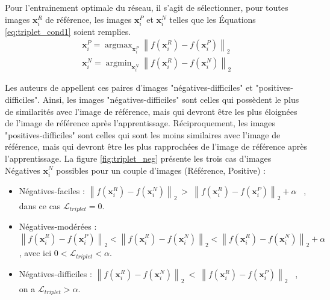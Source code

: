 Pour l'entrainement optimale du réseau, il s'agit de sélectionner, pour toutes images $\mathbf{x}_{i}^{R}$ de référence, les images $\mathbf{x}_{i}^{P}$ et $\mathbf{x}_{i}^{N}$ telles que les Équations \ref{eq:triplet_cond1} soient remplies.
\begin{equation} \label{eq:triplet_cond1}
\begin{split}
\mathbf{x}_{i}^{P}=\operatorname{argmax}_{\mathbf{x}_{i}^{P}}\left\|f\left(\mathbf{x}_{i}^{R}\right)-f\left(\mathbf{x}_{i}^{P}\right)\right\|_{2}
\\
\mathbf{x}_{i}^{N}=\operatorname{argmin}_{\mathbf{x}_{i}^{N}}\left\|f\left(\mathbf{x}_{i}^{R}\right)-f\left(\mathbf{x}_{i}^{N}\right)\right\|_{2}
\end{split}
\end{equation}

Les auteurs de \cite{schroff_facenet_2015} appellent ces paires d'images "négatives-difficiles" et "positives-difficiles". 
Ainsi, les images "négatives-difficiles" sont celles qui possèdent le plus de similarités avec l'image de référence, mais qui devront être les plus éloignées de l'image de référence après l'apprentissage.
Réciproquement, les images "positives-difficiles" sont celles qui sont les moins similaires avec l'image de référence, mais qui devront être les plus rapprochées de l'image de référence après l'apprentissage.
La figure \ref{fig:triplet_neg} présente les trois cas d'images Négatives $\mathbf{x}_{i}^{N}$ possibles pour un couple d'images (Référence, Positive) :
\begin{itemize}
	\item Négatives-faciles : $\left\|f\left(\mathbf{x}_{i}^{R}\right)-f\left(\mathbf{x}_{i}^{N}\right)\right\|_{2} \ > \ \left\|f\left(\mathbf{x}_{i}^{R}\right)-f\left(\mathbf{x}_{i}^{P}\right)\right\|_{2}+\alpha$ \ , dans ce cas $\mathcal{L}_{triplet}=0$.
	\item Négatives-modérées : $\left\|f\left(\mathbf{x}_{i}^{R}\right)-f\left(\mathbf{x}_{i}^{P}\right)\right\|_{2} < \left\|f\left(\mathbf{x}_{i}^{R}\right)-f\left(\mathbf{x}_{i}^{N}\right)\right\|_{2} < \left\|f\left(\mathbf{x}_{i}^{R}\right)-f\left(\mathbf{x}_{i}^{N}\right)\right\|_{2}+\alpha$, avec ici $0 < \mathcal{L}_{triplet} < \alpha$.
	\item Négatives-difficiles : $\left\|f\left(\mathbf{x}_{i}^{R}\right)-f\left(\mathbf{x}_{i}^{N}\right)\right\|_{2} \ < \ \left\|f\left(\mathbf{x}_{i}^{R}\right)-f\left(\mathbf{x}_{i}^{P}\right)\right\|_{2}$ \ , on a $\mathcal{L}_{triplet} > \alpha$.
\end{itemize}

